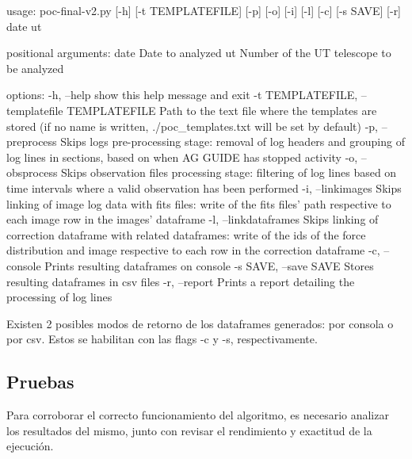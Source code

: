 \begin{myverbatim}[caption={Flags del codigo},label={myverbatim:flags}]
usage: poc-final-v2.py [-h] [-t TEMPLATEFILE] 
[-p] [-o] [-i] [-l] [-c] [-s SAVE] [-r] date ut

positional arguments:
  date              Date to analyzed
  ut                Number of the UT telescope to be analyzed

options:
  -h, --help        show this help message and exit
  -t TEMPLATEFILE, 
  --templatefile TEMPLATEFILE
                    Path to the text file where the templates
                    are stored (if no name is written, 
                    ./poc_templates.txt
                    will be set by default)
  -p, --preprocess  Skips logs pre-processing stage: removal
                    of log headers and grouping of log 
                    lines in sections, based on when 
                    AG GUIDE has stopped activity
  -o, --obsprocess  Skips observation files processing stage: 
                    filtering of log lines based on time 
                    intervals where a valid observation has 
                    been performed
  -i, --linkimages  Skips linking of image log data with 
                    fits files: write of the fits files' 
                    path respective to each image row 
                    in the images' dataframe
  -l, 
  --linkdataframes  Skips linking of correction 
                    dataframe with related dataframes: 
                    write of the ids of the force 
                    distribution and image respective 
                    to each row in the correction 
                    dataframe
  -c, --console     Prints resulting dataframes on console
  -s SAVE, 
  --save SAVE       Stores resulting dataframes in 
                    csv files
  -r, --report      Prints a report detailing the processing 
                    of log lines
\end{myverbatim}

Existen 2 posibles modos de retorno de los dataframes generados: por consola o por csv. Estos se habilitan con las flags -c y -s, respectivamente.

\subsection{Pruebas}

Para corroborar el correcto funcionamiento del algoritmo, es necesario analizar los resultados del mismo, junto con revisar el rendimiento y exactitud de la ejecución.


